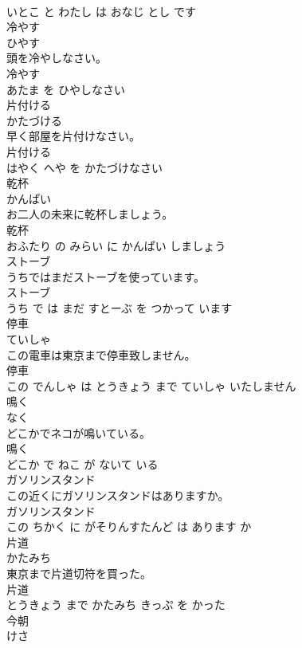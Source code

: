 \documentclass[8pt]{extreport}
\begin{document}
\begin{CJK}{UTF8}{min}
\\	いとこ と わたし は おなじ とし です			
\\	冷やす	
\\	ひやす			
\\	頭を冷やしなさい。	
\\	冷やす 
\\	あたま を ひやしなさい			
\\	片付ける	
\\	かたづける			
\\	早く部屋を片付けなさい。	
\\	片付ける 
\\	はやく へや を かたづけなさい			
\\	乾杯	
\\	かんぱい			
\\	お二人の未来に乾杯しましょう。	
\\	乾杯 
\\	おふたり の みらい に かんぱい しましょう			
\\	ストーブ	
\\	うちではまだストーブを使っています。	
\\	ストーブ 
\\	うち で は まだ すとーぶ を つかって います			
\\	停車	
\\	ていしゃ			
\\	この電車は東京まで停車致しません。	
\\	停車 
\\	この でんしゃ は とうきょう まで ていしゃ いたしません			
\\	鳴く	
\\	なく			
\\	どこかでネコが鳴いている。	
\\	鳴く 
\\	どこか で ねこ が ないて いる			
\\	ガソリンスタンド	
\\	この近くにガソリンスタンドはありますか。	
\\	ガソリンスタンド 
\\	この ちかく に がそりんすたんど は あります か			
\\	片道	
\\	かたみち			
\\	東京まで片道切符を買った。	
\\	片道 
\\	とうきょう まで かたみち きっぷ を かった			
\\	今朝	
\\	けさ			

\end{CJK}
\end{document}
